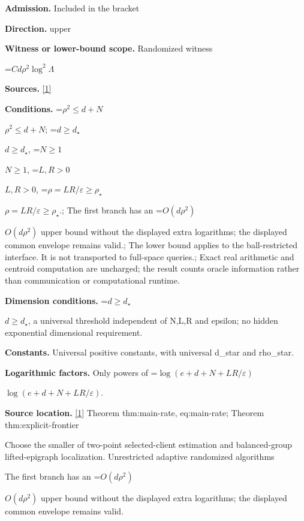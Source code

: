 \documentclass[10pt,a4paper]{article}
\newcommand{\AtlasMath}[1]{\par\begingroup\centering\setbox0=\hbox{$\displaystyle #1$}\ifdim\wd0>1.4\linewidth\typeout{ATLAS WIDE FORMULA: \the\wd0}\fi\ifdim\wd0>\linewidth\resizebox{\linewidth}{!}{\box0}\else\box0\fi\par\endgroup}
\newcommand{\AtlasInlineMath}[1]{\begingroup\setbox0=\hbox{$#1$}\ifdim\wd0>.4\linewidth\endgroup\AtlasMath{#1}\else\endgroup$#1$\fi}
\begin{document}
\textbf{Admission.} Included in the bracket



\textbf{Direction.} upper



\textbf{Witness or lower-bound scope.} Randomized witness



\AtlasMath{Cd\rho^2\log^2\Lambda}


\textbf{Sources.} \href{https://github.com/WU-Wendao/Colombo/blob/main/colombo_sensorium/Complexity_altas/data/sources/colombo/U05/manuscript.pdf}{[1]}



\textbf{Conditions.} \AtlasInlineMath{\rho^2\le d+N}; \AtlasInlineMath{d\ge d_\star}, \AtlasInlineMath{N\ge1}, \AtlasInlineMath{L,R>0}, \AtlasInlineMath{\rho=LR/\varepsilon\ge\rho_\star}.; The first branch has an \AtlasInlineMath{O(d\rho^2)} upper bound without the displayed extra logarithms; the displayed common envelope remains valid.; The lower bound applies to the ball-restricted interface. It is not transported to full-space queries.; Exact real arithmetic and centroid computation are uncharged; the result counts oracle information rather than communication or computational runtime.



\textbf{Dimension conditions.} \AtlasInlineMath{d\ge d_\star}, a universal threshold independent of N,L,R and epsilon; no hidden exponential dimensional requirement.



\textbf{Constants.} Universal positive constants, with universal d\_star and rho\_star.



\textbf{Logarithmic factors.} Only powers of \AtlasInlineMath{\log(e+d+N+LR/\varepsilon)}.



\textbf{Source location.} \href{https://github.com/WU-Wendao/Colombo/blob/main/colombo_sensorium/Complexity_altas/data/sources/colombo/U05/manuscript.pdf}{[1]} Theorem thm:main-rate, eq:main-rate; Theorem thm:explicit-frontier



Choose the smaller of two-point selected-client estimation and balanced-group lifted-epigraph localization. Unrestricted adaptive randomized algorithms



The first branch has an \AtlasInlineMath{O(d\rho^2)} upper bound without the displayed extra logarithms; the displayed common envelope remains valid.
\end{document}
